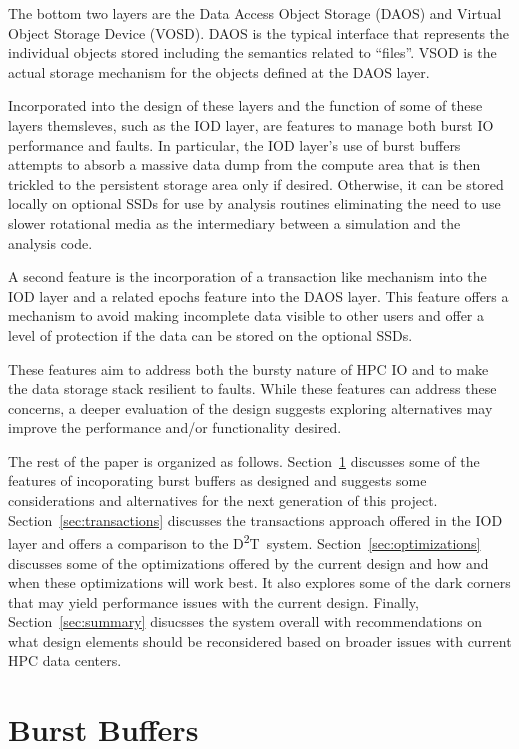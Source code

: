 \documentclass[conference]{sig-alt-gov2}
\newcommand{\DDT}{D\textsuperscript{2}T~}
\begin{document}
The bottom two layers are the Data Access Object Storage (DAOS) and Virtual
Object Storage Device (VOSD). DAOS is the typical interface that represents
the individual objects stored including the semantics related to ``files''.
VSOD is the actual storage mechanism for the objects defined at the DAOS layer.

Incorporated into the design of these layers and the function of some of these
layers themsleves, such as the IOD layer, are features to manage both burst IO
performance and faults. In particular, the IOD layer's use of burst buffers
attempts to absorb a massive data dump from the compute area that is then trickled to the persistent storage area only if desired. Otherwise, it can be stored
locally on optional SSDs for use by analysis routines eliminating the need to
use slower rotational media as the intermediary between a simulation and the
analysis code.

A second feature is the incorporation of a transaction like mechanism into the
IOD layer and a related epochs feature into the DAOS layer. This feature offers
a mechanism to avoid making incomplete data visible to other users and offer a
level of protection if the data can be stored on the optional SSDs.

These features aim to address both the bursty nature of HPC IO and to make the
data storage stack resilient to faults. While these features can address these
concerns, a deeper evaluation of the design suggests exploring alternatives
may improve the performance and/or functionality desired.

The rest of the paper is organized as follows. Section~\ref{sec:burst}
discusses some of the features of incoporating burst buffers as designed and
suggests some considerations and alternatives for the next generation of this
project. Section~\ref{sec:transactions} discusses the transactions approach
offered in the IOD layer and offers a comparison to the \DDT system.
Section~\ref{sec:optimizations} discusses some of the optimizations offered
by the current design and how and when these optimizations will work best. It
also explores some of the dark corners that may yield performance issues with
the current design. Finally, Section~\ref{sec:summary} disucsses the system
overall with recommendations on what design elements should be reconsidered
based on broader issues with current HPC data centers.

\section{Burst Buffers}
\label{sec:burst}
\end{document}
